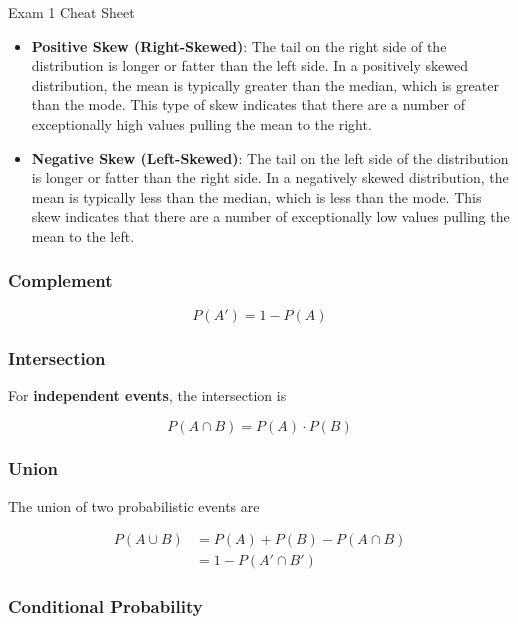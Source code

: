 \begin{cheatsheet}{Exam 1 Cheat Sheet}
    \begin{itemize}
        \item \textbf{Positive Skew (Right-Skewed)}: The tail on the right side of the distribution is longer or fatter than the left side. In a positively skewed distribution, the mean is typically 
        greater than the median, which is greater than the mode. This type of skew indicates that there are a number of exceptionally high values pulling the mean to the right.
        \item \textbf{Negative Skew (Left-Skewed)}: The tail on the left side of the distribution is longer or fatter than the right side. In a negatively skewed distribution, the mean is typically 
        less than the median, which is less than the mode. This skew indicates that there are a number of exceptionally low values pulling the mean to the left.
    \end{itemize}

    \subsubsection*{Complement}

    \begin{equation*}
        P(A') = 1 - P(A)
    \end{equation*}

    \subsubsection*{Intersection}

    For \textbf{independent events}, the intersection is

    \begin{equation*}
        P(A \cap B) = P(A) \cdot P(B)
    \end{equation*}

    \subsubsection*{Union}

    The union of two probabilistic events are

    \begin{align*}
        P(A \cup B) & = P(A) + P(B) - P(A \cap B) \\
        & = 1 - P(A' \cap B')
    \end{align*}

    \subsubsection*{Conditional Probability}


\end{cheatsheet}

